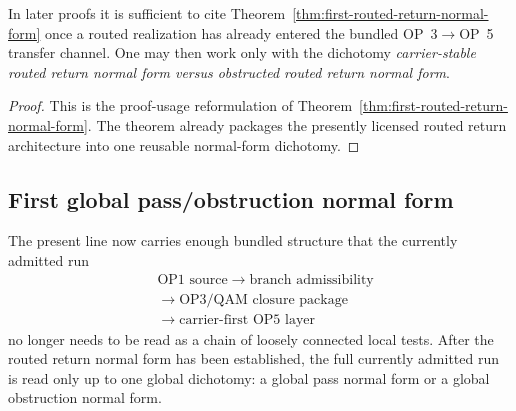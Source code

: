 \begin{corollary}
\label{cor:routed-return-normal-form-use-rule}
In later proofs it is sufficient to cite Theorem~\ref{thm:first-routed-return-normal-form} once a routed realization has already entered the bundled OP~3$\to$OP~5 transfer channel. One may then work only with the dichotomy \emph{carrier-stable routed return normal form versus obstructed routed return normal form}.
\end{corollary}

\begin{proof}
This is the proof-usage reformulation of Theorem~\ref{thm:first-routed-return-normal-form}. The theorem already packages the presently licensed routed return architecture into one reusable normal-form dichotomy.
\end{proof}


\subsection{First global pass/obstruction normal form}
\label{sec:first-global-pass-obstruction-normal-form}

\begin{remark}
The present line now carries enough bundled structure that the currently admitted run
\[
\begin{aligned}
&\text{OP1 source}
\;\to\;\text{branch admissibility}\\[0.15em]
&\;\to\;\text{OP3/QAM closure package}\\[0.15em]
&\;\to\;\text{carrier-first OP5 layer}
\end{aligned}
\]
no longer needs to be read as a chain of loosely connected local tests. After the routed
return normal form has been established, the full currently admitted run is read only up to
one global dichotomy: a global pass normal form or a global obstruction normal form.
\end{remark}

